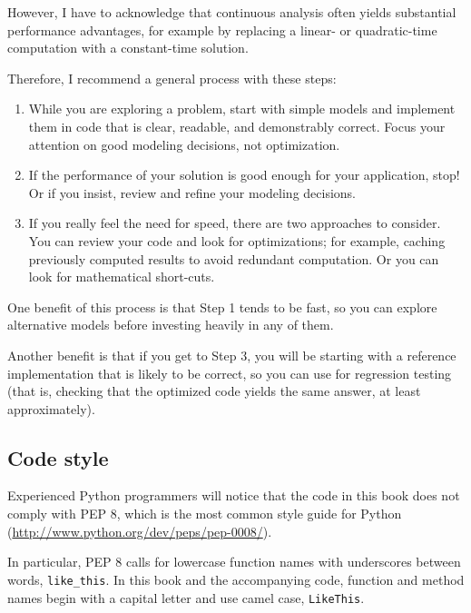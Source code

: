 \documentclass[12pt]{book}
\begin{document}
However, I have to acknowledge that continuous analysis often yields
substantial performance advantages, for example by replacing a
linear- or quadratic-time computation with a constant-time
solution.

Therefore, I recommend a general process with these steps:

\begin{enumerate}

\item While you are exploring a problem, start with simple models
and implement them in code that is clear, readable, and demonstrably
correct.  Focus your attention on good modeling decisions, not
optimization.

\item If the performance of your solution is good enough for your
application, stop!  Or if you insist, review and refine your modeling
decisions.

\item If you really feel the need for speed, there are two approaches
to consider.  You can review your code and look for optimizations; for
example, caching previously computed results to avoid redundant
computation.  Or you can look for mathematical short-cuts.  

\end{enumerate}

One benefit of this process is that Step 1 tends to be fast, so
you can explore alternative models before investing heavily in
any of them.

Another benefit is that if you get to Step 3, you will be starting
with a reference implementation that is likely to be correct, so
you can use for regression testing (that is, checking that the
optimized code yields the same answer, at least approximately).


\subsection*{Code style}

Experienced Python programmers will notice that the code in this
book does not comply with PEP 8, which is the most common
style guide for Python (\url{http://www.python.org/dev/peps/pep-0008/}).

In particular, PEP 8 calls for lowercase function names with
underscores between words, \verb"like_this".  In this book and
the accompanying code, function and method names begin with
a capital letter and use camel case, \verb"LikeThis".
\end{document}
